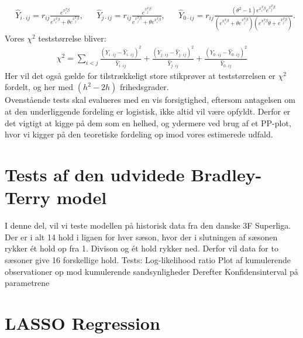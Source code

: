 \documentclass[11pt,a4paper]{article}
\begin{document}
\begin{align*}
&\hat{Y}_{i\cdot ij} = r_{ij}\frac{e^{x_i^T\beta}}{e^{x_i^T\beta}+\theta e^{x_j^T\beta}},
&&\hat{Y}_{j\cdot ij} = r_{ij}\frac{e^{x_j^T\beta}}{e^{x_j^T\beta}+\theta e^{x_i^T\beta}},
&&\hat{Y}_{0\cdot ij} = r_{ij}\frac{(\theta^2-1)e^{x_i^T\beta}e^{x_j^T\beta}}{(e^{x_i^T\beta}+\theta e^{x_j^T\beta})(e^{x_i^T\beta}\theta +e^{x_j^T\beta})}.
\end{align*}
Vores $\chi^2$ teststørrelse bliver:
\begin{align*}
\chi^2 = \sum_{i<j} \frac{(Y_{i\cdot ij}-\hat{Y}_{i\cdot ij})^2}{\hat{Y}_{i\cdot ij}} + \frac{(Y_{j\cdot ij}-\hat{Y}_{j\cdot ij})^2}{\hat{Y}_{j\cdot ij}} + \frac{(Y_{0\cdot ij}-\hat{Y}_{0\cdot ij})^2}{\hat{Y}_{0\cdot ij}}
\end{align*}
Her vil det også gælde for tilstrækkeligt store stikprøver at teststørrelsen er $\chi^2$ fordelt, og her med $(h^2-2h)$ frihedsgrader. \\
Ovenstående tests skal evalueres med en vis forsigtighed, eftersom antagelsen om at den underliggende fordeling er logistisk, ikke altid vil være opfyldt. Derfor er det vigtigt at kigge på dem som en helhed, og ydermere ved brug af et PP-plot, hvor vi kigger på den teoretiske fordeling op imod vores estimerede udfald. 

\section{Tests af den udvidede Bradley-Terry model}
I denne del, vil vi teste modellen på historisk data fra den danske 3F Superliga. Der er i alt 14 hold i ligaen for hver sæson, hvor der i slutningen af sæsonen rykker ét hold op fra 1. Divison og ét hold rykker ned. Derfor vil data for to sæsoner give 16 forskellige hold.  
Tests:
Log-likelihood ratio
Plot af kumulerende observationer op mod kumulerende sandsynligheder
Derefter
Konfidensinterval på parametrene
\clearpage
\section{LASSO Regression}

\printbibliography %
\end{document}
